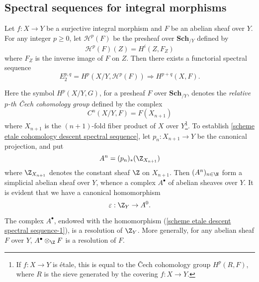 \subsection{Spectral sequences for integral morphisms}
\begin{proposition}\label{scheme etale cohomology descent spectral sequence}
Let $f:X\to Y$ be a surjective integral morphism and $F$ be an abelian sheaf over $Y$. For any integer $p\geq 0$, let $\mathcal{H}^p(F)$ be the presheaf over $\mathbf{Sch}_{/Y}$ defined by
\[\mathcal{H}^p(F)(Z)=H^i(Z,F_Z)\]
where $F_Z$ is the inverse image of $F$ on $Z$. Then there exists a functorial spectral sequence
\[E_2^{p,q}=H^p(X/Y,\mathcal{H}^p(F))\Rightarrow H^{p+q}(X,F).\]
\end{proposition}
Here the symbol $H^p(X/Y,G)$, for a presheaf $F$ over $\mathbf{Sch}_{/Y}$, denotes the \textit{relative $p$-th \v{C}ech cohomology group} defined by the complex 
\[C^n(X/Y,F)=F(X_{n+1})\]
where $X_{n+1}$ is the $(n+1)$-fold fiber product of $X$ over $Y$\footnote{If $f:X\to Y$ is \'etale, this is equal to the \v{C}ech cohomology group $H^p(R,F)$, where $R$ is the sieve generated by the covering $f:X\to Y$.}. To establish \cref{scheme etale cohomology descent spectral sequence}, let $p_n:X_{n+1}\to Y$ be the canonical projection, and put
\[A^n=(p_n)_*(\Z_{X_{n+1}})\]
where $\Z_{X_{n+1}}$ denotes the constant sheaf $\Z$ on $X_{n+1}$. Then $(A^n)_{n\in\N}$ form a simplicial abelian sheaf over $Y$, whence a complex $A^\bullet$ of abelian sheaves over $Y$. It is evident that we have a canonical homomorphism
\begin{equation}\label{scheme etale descent spectral sequence-1}
\varepsilon:\Z_Y\to A^0.
\end{equation}
\begin{lemma}\label{scheme etale generalized Cech resolution}
The complex $A^\bullet$, endowed with the homomorphism (\ref{scheme etale descent spectral sequence-1}), is a resolution of $\Z_Y$. More generally, for any abelian sheaf $F$ over $Y$, $A^\bullet\otimes_\Z F$ is a resolution of $F$.
\end{lemma}
